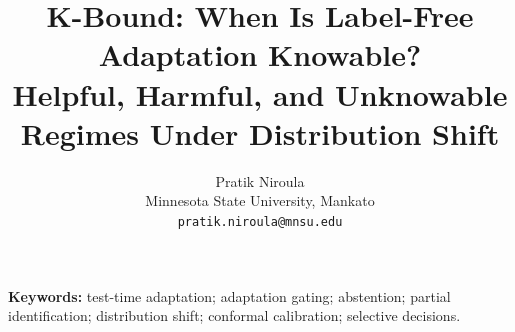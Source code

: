 \documentclass[11pt,twocolumn]{article}
\title{\vspace{-1.5em}\textbf{K-Bound: When Is Label-Free Adaptation Knowable?}\\[-1pt]
\large Helpful, Harmful, and Unknowable Regimes Under Distribution Shift}
\author{Pratik Niroula\\
\small Minnesota State University, Mankato\\
\small \texttt{pratik.niroula@mnsu.edu}}
\date{}
\theoremstyle{plain}
\theoremstyle{definition}
\theoremstyle{remark}
\begin{document}
\maketitle
\begin{abstract}\end{abstract}
\noindent\textbf{Keywords:} test-time adaptation; adaptation gating; abstention; partial
identification; distribution shift; conformal calibration; selective decisions.

\FloatBarrier
{\small}
\clearpage
{}
\onecolumn
\newcommand{\KBoundSingleColumnLayout}{}

\end{document}
